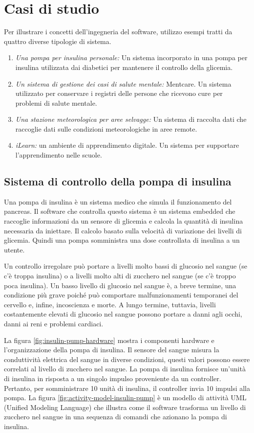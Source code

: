 \section{Casi di studio}
Per illustrare i concetti dell'ingegneria del software, utilizzo esempi tratti da quattro diverse tipologie di sistema.
\begin{enumerate}
    \item \textit{Una pompa per insulina personale:} Un sistema incorporato in una pompa per insulina utilizzata dai diabetici per mantenere il controllo della glicemia.
    \item \textit{Un sistema di gestione dei casi di salute mentale:} Mentcare. Un sistema utilizzato per conservare i registri delle persone che ricevono cure per problemi di salute mentale.
    \item \textit{Una stazione meteorologica per aree selvagge:} Un sistema di raccolta dati che raccoglie dati sulle condizioni meteorologiche in aree remote.
    \item \textit{iLearn:} un ambiente di apprendimento digitale. Un sistema per supportare l'apprendimento nelle scuole.
\end{enumerate}

\subsection*{Sistema di controllo della pompa di insulina}
Una pompa di insulina è un sistema medico che simula il funzionamento del pancreas. Il software che controlla questo sistema è un sistema embedded che raccoglie informazioni da un sensore di glicemia e calcola la quantità di insulina necessaria da iniettare. Il calcolo basato sulla velocità di variazione dei livelli di glicemia. Quindi una pompa somministra una dose controllata di insulina a un utente.

Un controllo irregolare può portare a livelli molto bassi di glucosio nel sangue (se c'è troppa insulina) o a livelli molto alti di zucchero nel sangue (se c'è troppo poca insulina). Un basso livello di glucosio nel sangue è, a breve termine, una condizione più grave poiché può comportare malfunzionamenti temporanei del cervello e, infine, incoscienza e morte. A lungo termine, tuttavia, livelli costantemente elevati di glucosio nel sangue possono portare a danni agli occhi, danni ai reni e problemi cardiaci.

La figura \ref{fig:insulin-pump-hardware} mostra i componenti hardware e l'organizzazione della pompa di insulina. Il sensore del sangue misura la conduttività elettrica del sangue in diverse condizioni, questi valori possono essere correlati al livello di zucchero nel sangue. La pompa di insulina fornisce un'unità di insulina in risposta a un singolo impulso proveniente da un controller. Pertanto, per somministrare 10 unità di insulina, il controller invia 10 impulsi alla pompa. La figura \ref{fig:activity-model-insulin-pump} è un modello di attività UML (Unified Modeling Language) che illustra come il software trasforma un livello di zucchero nel sangue in una sequenza di comandi che azionano la pompa di insulina.

